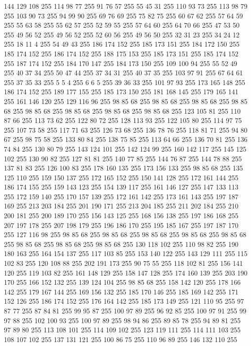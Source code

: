 144 129 108 255 114 98 77 255 91 76 57 255 55 45 31 255 110 93 73 255 113 98 79 255 103 90 73 255 94 99 90 255 69 76 69 255 75 82 75 255 60 67 62 255 57 64 59 255 55 63 58 255 55 62 57 255 52 59 55 255 57 64 60 255 64 70 66 255 47 53 50 255 49 56 52 255 49 56 52 255 52 60 56 255 49 56 50 255 32 31 23 255 34 24 12 255 18 11 4 255 54 49 43 255 186 174 152 255 185 173 151 255 184 172 150 255 185 174 152 255 186 174 152 255 188 175 153 255 185 173 151 255 185 174 152 255 187 174 152 255 184 170 147 255 184 173 150 255 109 100 94 255 55 52 49 255 40 37 34 255 50 47 44 255 37 34 31 255 40 37 35 255 103 97 91 255 67 64 61 255 37 35 33 255 5 5 4 255 6 6 5 255 39 36 33 255 101 97 93 255 173 165 148 255 186 174 152 255 189 177 155 255 185 173 150 255 181 168 145 255 179 165 141 255 161 146 120 255 129 116 96 255 98 85 68 255 98 85 68 255 98 85 68 255 98 85 68 255 98 85 68 255 98 85 68 255
98 85 68 255 98 85 68 255 123 105 81 255 110 87 66 255 113 73 62 255 122 80 72 255 128 113 93 255 122 105 80 255 114 97 75 255 107 73 58 255 117 71 63 255 126 73 68 255 136 78 76 255 118 81 71 255 94 80 67 255 98 75 58 255 133 80 84 255 138 75 85 255 113 64 66 255 136 70 81 255 136 74 84 255 130 80 79 255 143 124 101 255 142 124 99 255 160 142 117 255 145 125 102 255 130 90 82 255 127 81 81 255 140 77 85 255 144 76 87 255 144 78 88 255 137 81 83 255 126 100 83 255 178 160 135 255 173 156 133 255 98 85 68 255 135 125 110 255 159 150 137 255 172 165 152 255 150 141 128 255 172 161 144 255 186 174 155 255 159 143 123 255 154 139 117 255 161 146 127 255 147 133 113 255 172 159 140 255 170 157 139 255 172 161 142 255 173 161 143 255 197 187 169 255 213 203 184 255 201 190 171 255 213 204 185 255 211 202 184 255 210 200 181 255 200 189 170 255 156 143 125 255 168 156 138 255 197 186 168 255 207 197 178 255 207 198 179 255 196 186 170 255 195 185 167 255
197 187 170 255 127 116 98 255 98 85 68 255 98 85 68 255 98 85 68 255 98 85 68 255 98 85 68 255 98 85 68 255 98 85 68 255 98 85 68 255 130 118 102 255 110 98 82 255 190 180 163 255 164 154 137 255 117 103 85 255 153 140 122 255 143 129 111 255 115 102 83 255 120 108 88 255 202 191 173 255 90 75 55 255 118 102 81 255 156 141 120 255 119 103 82 255 161 148 129 255 158 147 128 255 174 160 139 255 203 190 170 255 166 152 132 255 139 124 104 255 98 85 68 255 158 142 120 255 178 166 142 255 179 167 144 255 169 156 132 255 185 170 146 255 185 169 142 255 171 152 126 255 186 174 152 255 176 164 142 255 185 173 149 255 121 110 95 255 97 87 77 255 87 84 81 255 99 95 87 255 100 97 89 255 96 92 85 255 100 97 91 255 99 97 88 255 102 100 93 255 100 97 89 255 98 94 86 255 89 85 78 255 94 89 81 255 97 89 80 255 113 108 101 255 114 109 102 255 123 119 111 255 114 111 103 255 108 107 102 255 137 131 121 255 100 86 75 255 110 96 89 255 146 132 110 255
